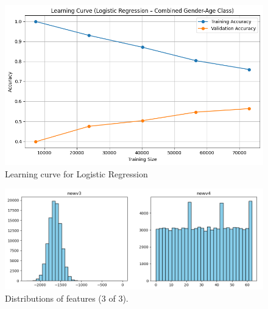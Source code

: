\documentclass[10pt,twocolumn]{article}
\begin{document}
\begin{figure}[H]
    \centering
    \includegraphics[width=1\linewidth]{images/lr/cross-validation - normal.png}
    \caption{Learning curve for Logistic Regression}
    \label{fig:reduced-learning-curve}
\end{figure}

\begin{figure}[H]
    \centering
    \includegraphics[width=0.85\linewidth]{images/distribution_3.png}
    \caption{Distributions of features (3 of 3).}
    \label{fig:distribution-3}
\end{figure}
\end{document}
